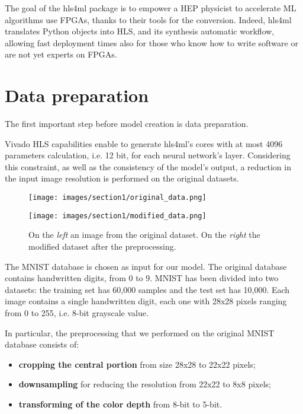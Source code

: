 \documentclass{article}
\begin{document}
\par The goal of the hls4ml package is to empower a HEP physicist to accelerate
ML algorithms use FPGAs, thanks to their tools for the conversion. 
Indeed, hls4ml translates Python objects into HLS, and its
synthesis automatic workflow, allowing fast deployment times also for
those who know how to write software or are not yet experts on FPGAs.




\section{Data preparation}
The first important step before model creation is data preparation.
\par Vivado HLS capabilities enable to generate hls4ml's cores with 
at most 4096 parameters calculation, i.e. 12 bit, for each neural network's layer. 
Considering this constraint, as well as the consistency of the model's output,
a reduction in the input image resolution is performed on the original datasets. 

\begin{figure}[H]
  \centering
  \begin{minipage}[c]{.4\textwidth}
   {\texttt{[image: images/section1/original\_data.png]}}
    \end{minipage}
    \qquad \qquad
      \begin{minipage}[c]{0.4\textwidth}
  {\texttt{[image: images/section1/modified\_data.png]}}
     \end{minipage}
     \quad
     
   \caption{On the \textit{left} an image from the original dataset.
   On the \textit{right} the modified dataset after the preprocessing.}
    \label{fig:MNIST}
\end{figure}

\par The MNIST database is chosen as input for our model.
The original database contains handwritten digits, from 0 to 9. 
MNIST has been divided into two datasets: the training set has 60,000 samples and the test set has 10,000.
Each image contains a single handwritten digit, each one with 28x28 pixels 
ranging from 0 to 255, i.e. 8-bit grayscale value.
\par In particular, the preprocessing that we performed on the original MNIST database consists of:
\begin{itemize}
    \item \textbf{cropping the central portion} from size 28x28 to 22x22 pixels;
    \item \textbf{downsampling} for reducing the resolution from 22x22 to 8x8 pixels;
    \item \textbf{transforming of the color depth} from 8-bit to 5-bit.
\end{itemize}
\end{document}
